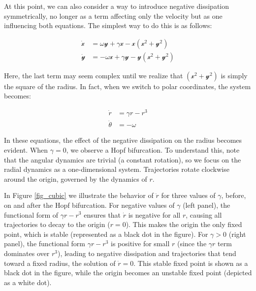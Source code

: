 \documentclass{article}
\begin{document}
At this point, we can also consider a way to introduce negative dissipation symmetrically, no longer as a term affecting only the velocity but as one influencing both equations. 
The simplest way to do this is as follows:

\begin{subequations} \label{eq_symosc_neg_diss}
\begin{align}
    \dot{\mathscr{x}} & = \omega\mathscr{y} + \gamma\mathscr{x} - \mathscr{x}(\mathscr{x}^2 + \mathscr{y}^2) \\
    \dot{\mathscr{y}} & = -\omega\mathscr{x} + \gamma\mathscr{y} - \mathscr{y}(\mathscr{x}^2 + \mathscr{y}^2)
\end{align}
\end{subequations}

Here, the last term may seem complex until we realize that $(\mathscr{x}^2 + \mathscr{y}^2)$ is simply the square of the radius. In fact, when we switch to polar coordinates, the system becomes:

\begin{subequations} \label{eq_symosc_neg_diss_polar}
\begin{align}
    \dot{r} & = \gamma r - r^3 \\
    \dot{\theta} & = -\omega
\end{align}
\end{subequations}

In these equations, the effect of the negative dissipation on the radius becomes evident. When $\gamma = 0$, we observe a Hopf bifurcation. To understand this, note that the angular dynamics are trivial (a constant rotation), so we focus on the radial dynamics as a one-dimensional system. Trajectories rotate clockwise around the origin, governed by the dynamics of $r$.

In Figure \ref{fig_cubic} we illustrate the behavior of $\dot{r}$ for three values of $\gamma$, before, on and after the Hopf bifurcation.
For negative values of $\gamma$ (left panel), the functional form of $\gamma r - r^3$ ensures that $\dot{r}$ is negative for all $r$, causing all trajectories to decay to the origin ($r = 0$). 
This makes the origin the only fixed point, which is stable (represented as a black dot in the figure). 
For $\gamma > 0$ (right panel), the functional form $\gamma r - r^3$ is positive for small $r$ (since the $\gamma r$ term dominates over $r^3$), leading to negative dissipation and trajectories that tend toward a fixed radius, the solution of $\dot{r} = 0$. 
This stable fixed point is shown as a black dot in the figure, while the origin becomes an unstable fixed point (depicted as a white dot).
\end{document}
